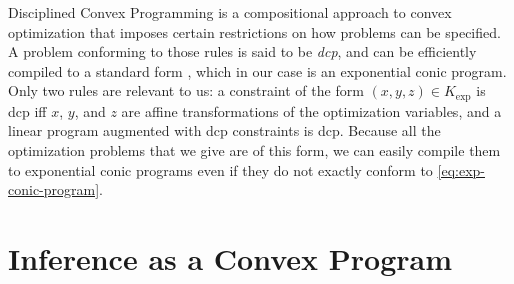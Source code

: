Disciplined Convex Programming \parencite{dcp-thesis} is a
compositional approach to convex optimization that 
imposes certain restrictions on how problems can be specified.
A problem conforming to those rules is said to be \emph{dcp},
and can be efficiently compiled to a standard form
\parencite{agrawal2018rewriting},
which in our case is an exponential conic program.
Only two rules are relevant to us: a constraint of the form
$(x,y,z) \in K_{\exp}$ is
    dcp iff $x$, $y$, and $z$ are affine transformations of the
    optimization variables, 
and a linear program
augmented
with dcp 
constraints is dcp.
Because all the optimization problems that we give are
of this form,
we can easily compile them
to exponential conic programs even if they do not exactly conform to \eqref{eq:exp-conic-program}.






\section{Inference as a Convex Program}
    \label{sec:inf-as-cvx-program}

